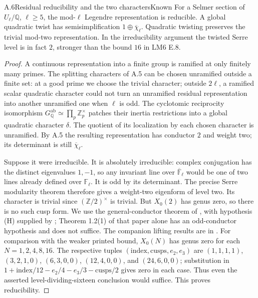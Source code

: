 \begin{statement}{A.6}{Residual reducibility and the two characters}{Known}
For a Selmer section of $U_\ell/\mathbb Q$, $\ell\geq5$, the mod-$\ell$
Legendre representation is reducible. A global quadratic twist has
semisimplification $1\oplus\overline\chi_\ell$. Quadratic twisting preserves
the trivial mod-two representation. In the irreducibility argument the
twisted Serre level is in fact $2$, stronger than the bound $16$ in LM6 E.8.
\end{statement}
\begin{proof}
A continuous representation into a finite group is ramified at only
finitely many primes. The splitting characters of A.5 can be chosen
unramified outside a finite set: at a good prime we choose the trivial
character; outside $2\ell$, a ramified scalar quadratic character could
not turn an unramified residual representation into another unramified
one when $\ell$ is odd. The cyclotomic reciprocity isomorphism
$G_{\mathbb Q}^{\mathrm{ab}}\simeq\prod_p\mathbb Z_p^\times$ patches
their inertia restrictions into a global quadratic character $\delta$.
The quotient of its localization by each chosen character is unramified.
By A.5 the resulting representation has conductor $2$ and weight two;
its determinant is still $\overline\chi_\ell$.

Suppose it were irreducible. It is absolutely irreducible: complex
conjugation has the distinct eigenvalues $1,-1$, so any invariant line
over $\overline{\mathbb F}_\ell$ would be one of two lines already
defined over $\mathbb F_\ell$. It is odd by its determinant. The precise
Serre modularity theorem therefore gives a weight-two eigenform of
level two. Its character is trivial since
$(\mathbb Z/2)^\times$ is trivial. But $X_0(2)$ has genus zero, so there
is no such cusp form. We use the general-conductor theorem of
\citet[Theorem 9.1]{AMKhareWintenbergerI2009}, with hypothesis (H)
supplied by \citet[Theorem (0.1) and Corollary (0.2)]{AMKisin2009};
Theorem 1.2(1) of that paper alone has an odd-conductor hypothesis and
does not suffice. The companion lifting results are in
\citet{AMKhareWintenbergerII2009}. For comparison with the weaker
printed bound, $X_0(N)$ has genus zero for each $N=1,2,4,8,16$.
The respective tuples
$(\text{index},\text{cusps},e_2,e_3)$ are
$(1,1,1,1)$, $(3,2,1,0)$, $(6,3,0,0)$, $(12,4,0,0)$, and
$(24,6,0,0)$; substitution in
$1+\text{index}/12-e_2/4-e_3/3-\text{cusps}/2$ gives zero in
each case. Thus even the asserted level-dividing-sixteen conclusion
would suffice. This proves reducibility.


\end{proof}
